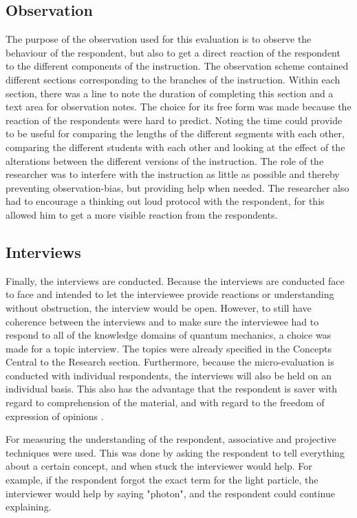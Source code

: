 \documentclass[11pt,twoside]{report} %
\begin{document}
\subsection{Observation}

The purpose of the observation used for this evaluation is to observe the behaviour of the respondent, but also to get a direct reaction of the respondent to the different components of the instruction. The observation scheme contained different sections corresponding to the branches of the instruction. Within each section, there was a line to note the duration of completing this section and a text area for observation notes. The choice for its free form was made because the reaction of the respondents were hard to predict. Noting the time could provide to be useful for comparing the lengths of the different segments with each other, comparing the different students with each other and looking at the effect of the alterations between the different versions of the instruction. The role of the researcher was to interfere with the instruction as little as possible and thereby preventing observation-bias, but providing help when needed. The researcher also had to encourage a thinking out loud protocol with the respondent, for this allowed him to get a more visible reaction from the respondents.

\subsection{Interviews}

Finally, the interviews are conducted. Because the interviews are conducted face to face and intended to let the interviewee provide reactions or understanding without obstruction, the interview would be open. However, to still have coherence between the interviews and to make sure the interviewee had to respond to all of the knowledge domains of quantum mechanics, a choice was made for a topic interview. The topics were already specified in the Concepts Central to the Research section. Furthermore, because the micro-evaluation is conducted with individual respondents, the interviews will also be held on an individual basis. This also has the advantage that the respondent is saver with regard to comprehension of the material, and with regard to the freedom of expression of opinions \cite{kwalitatief}.

For measuring the understanding of the respondent, associative and projective techniques were used. This was done by asking the respondent to tell everything about a certain concept, and when stuck the interviewer would help. For example, if the respondent forgot the exact term for the light particle, the interviewer would help by saying "photon", and the respondent could continue explaining.
\end{document}
